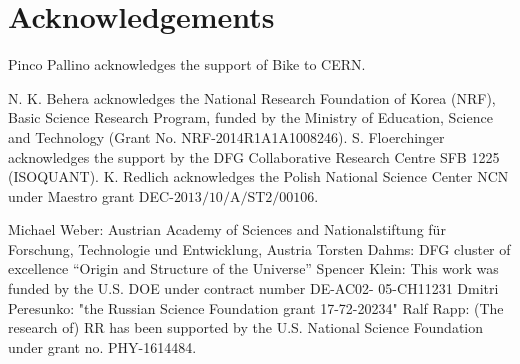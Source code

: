 \section*{Acknowledgements}


Pinco Pallino acknowledges the support of Bike to CERN.

N. K. Behera acknowledges the National Research Foundation of Korea (NRF), Basic Science Research Program, funded by the Ministry of Education, Science and Technology (Grant No. NRF-2014R1A1A1008246).
S. Floerchinger acknowledges the support by the DFG Collaborative Research Centre SFB 1225 (ISOQUANT). 
K. Redlich acknowledges the Polish National Science Center NCN under Maestro grant DEC-$\mathrm{2013/10/A/ST2/00106}$. 

Michael Weber: Austrian Academy of Sciences and Nationalstiftung f\"ur Forschung, Technologie und Entwicklung, Austria
Torsten Dahms: DFG cluster of excellence ``Origin and Structure of the Universe'' 
Spencer Klein: This work was funded by the U.S. DOE under contract number DE-AC02- 05-CH11231
Dmitri Peresunko: "the Russian Science Foundation grant 17-72-20234"
Ralf Rapp: (The research of) RR has been supported by the U.S. National Science Foundation under
grant no. PHY-1614484.